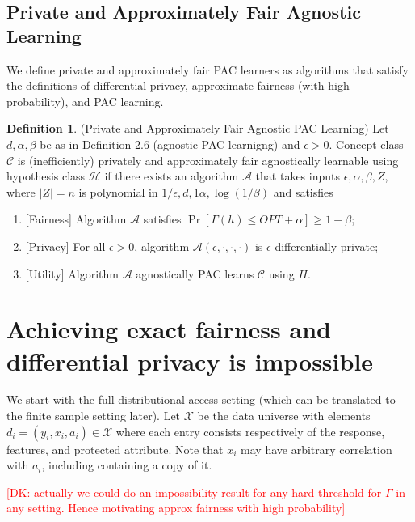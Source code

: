 \documentclass[format = sigconf]{acmart}
\newcommand{\dk}[1]{\textcolor{red}{[DK: #1]}}
\newcommand{\A}{\mathcal{A}}
\renewcommand{\H}{\mathcal{H}}
\renewcommand{\C}{\mathcal{C}}
\newcommand{\1}{\mathbbm{1}}
\newcommand{\eps}{\epsilon}
\theoremstyle{definition}
\newtheorem{defn}{Definition}[section]
\begin{document}
\subsection{Private and Approximately Fair Agnostic Learning}
We define private and approximately fair PAC learners as algorithms that satisfy the definitions of differential privacy, approximate fairness (with high probability), and PAC learning.
\begin{defn}
	(Private and Approximately Fair Agnostic PAC Learning)
	Let $d, \alpha, \beta$ be as in Definition 2.6 (agnostic PAC
  learnigng) and $\eps > 0$. Concept class $\C$ is (inefficiently)
  privately and approximately fair agnostically learnable using
  hypothesis class $\H$ if there exists an algorithm $\A$ that takes
  inputs $\eps, \alpha, \beta, Z$, where $|Z|=n$ is polynomial in
  $1/\eps, d, 1\alpha, \log(1/\beta)$ and satisfies
	\begin{enumerate}
		\item {[}Fairness{]} Algorithm $\A$ satisfies $\Pr[\Gamma(h) \leq
    OPT + \alpha] \geq 1-\beta$;
		\item {[}Privacy{]} For all $\eps>0$, algorithm $\A(\eps, \cdot, \cdot, \cdot)$ is $\eps$-differentially private;
		\item {[}Utility{]} Algorithm $\A$ agnostically PAC learns $\C$ using $H$.
	\end{enumerate}
\end{defn}

\section{Achieving exact fairness and differential privacy is impossible}
We start with the full distributional access setting (which can be translated to the finite sample setting later). Let $\mathcal{X}$ be the data universe with elements $d_i = (y_i,x_i,a_i) \in \mathcal{X}$ where each entry consists respectively of the response, features, and protected attribute. Note that $x_i$ may have arbitrary correlation with $a_i$, including containing a copy of it.


\dk {actually we could do an impossibility result for
	any hard threshold for $\Gamma$ in any setting. Hence motivating approx
	fairness with high probability}
\end{document}
